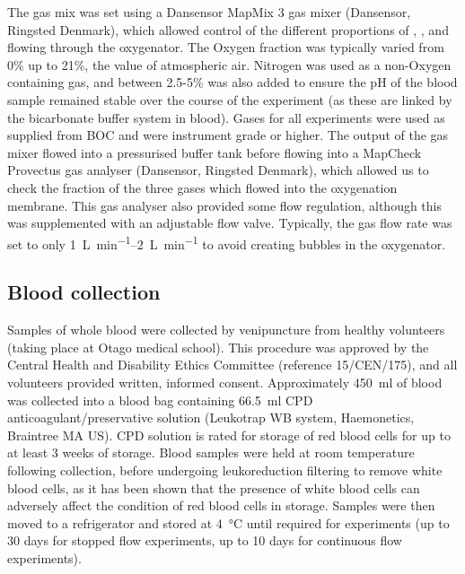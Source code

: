 The gas mix was set using a Dansensor MapMix 3 gas mixer (Dansensor, Ringsted Denmark), which allowed control of the different proportions of \Ntwo, \Otwo, and \COtwo flowing through the oxygenator.
The Oxygen fraction was typically varied from 0\% up to 21\%, the value of atmospheric air.
Nitrogen was used as a non-Oxygen containing gas, and between 2.5-5\% \COtwo was also added to ensure the pH of the blood sample remained stable over the course of the experiment (as these are linked by the bicarbonate buffer system in blood).
Gases for all experiments were used as supplied from BOC and were instrument grade or higher.
The output of the gas mixer flowed into a pressurised buffer tank before flowing into a MapCheck Provectus gas analyser (Dansensor, Ringsted Denmark), which allowed us to check the fraction of the three gases which flowed into the oxygenation membrane.
This gas analyser also provided some flow regulation, although this was supplemented with an adjustable flow valve.
Typically, the gas flow rate was set to only \SIrange[per-mode=symbol]{1}{2}{\liter\per\minute} to avoid creating bubbles in the oxygenator.

\subsection{Blood collection}
Samples of whole blood were collected by venipuncture from healthy volunteers (taking place at Otago medical school).
This procedure was approved by the Central Health and Disability Ethics Committee (reference 15/CEN/175), and all volunteers provided written, informed consent.
Approximately \SI{450}{ml} of blood was collected into a blood bag containing \SI{66.5}{\milli\litre} CPD anticoagulant/preservative solution (Leukotrap WB system, Haemonetics, Braintree MA US).
CPD solution is rated for storage of red blood cells for up to at least 3 weeks of storage\cite{Hessupdatesolutionsred2006}.
Blood samples were held at room temperature following collection, before undergoing leukoreduction filtering to remove white blood cells, as it has been shown that the presence of white blood cells can adversely affect the condition of red blood cells in storage\cite{Hessupdatesolutionsred2006}.
Samples were then moved to a refrigerator and stored at \SI{4}{\degreeCelsius} until required for experiments (up to 30 days for stopped flow experiments, up to 10 days for continuous flow experiments).

